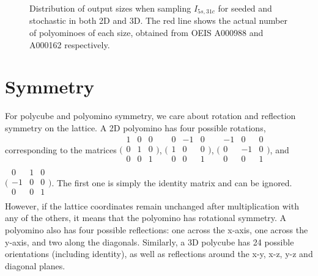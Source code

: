 

\begin{figure}[h]
    \centering
    \caption{Distribution of output sizes when sampling \(I_{5s,31c}\) for seeded and stochastic in both 2D and 3D. The red line shows the actual number of polyominoes of each size, obtained from OEIS A000988 and A000162 \cite{sloane1995encyclopedia, oeisA000988} respectively.}
    \label{fig:main_distr}
\end{figure}

\section{Symmetry}

For polycube and polyomino symmetry, we care about rotation and reflection symmetry on the lattice. A 2D polyomino has four possible rotations, corresponding to the matrices $\big(\begin{smallmatrix}
    1 & 0 & 0\\
    0 & 1 & 0\\
    0 & 0 & 1\\
\end{smallmatrix}\big)$, $\big(\begin{smallmatrix}
    0 & -1 & 0\\
    1 & 0 & 0\\
    0 & 0 & 1\\
\end{smallmatrix}\big)$, $\big(\begin{smallmatrix}
    -1 & 0 & 0\\
    0 & -1 & 0\\
    0 & 0 & 1\\
\end{smallmatrix}\big)$, and $\big(\begin{smallmatrix}
    0 & 1 & 0\\
    -1 & 0 & 0\\
    0 & 0 & 1\\
\end{smallmatrix}\big)$. The first one is simply the identity matrix and can be ignored. However, if the lattice coordinates remain unchanged after multiplication with any of the others, it means that the polyomino has rotational symmetry. A polyomino also has four possible reflections: one across the x-axis, one across the y-axis, and two along the diagonals. Similarly, a 3D polycube has 24 possible orientations (including identity), as well as reflections around the x-y, x-z, y-z and diagonal planes.

